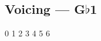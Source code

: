 \subsection{Voicing --- \UiKey{\I}\UiKey{\SET}G$\flat$1}









































0
1
2
3
4
5
6
